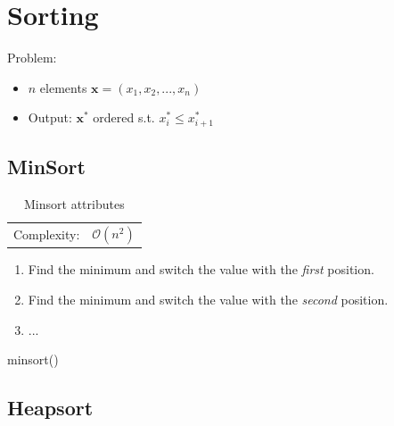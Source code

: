 \documentclass[12pt, a4paper]{scrartcl}
\author{Michael Floßmann}
\begin{document}
\tableofcontents{}
\section{Sorting}
\label{sec:sorting}
Problem:
\begin{itemize}
\item $n$ elements $\mathbf{x}=(x_1,x_2,...,x_n)$
\item Output: $\mathbf{x^*}$ ordered s.t. $x^*_i\le x^*_{i+1}$
\end{itemize}

\subsection{MinSort}
\label{sec:minsort}
\begin{table}[!h]
  \centering
  \begin{tabular}{lc}
    Complexity:&$\mathcal{O}(n^2)$
  \end{tabular}
  \caption{Minsort attributes}
  \label{tab:minsort}
\end{table}
\begin{enumerate}
\item Find the minimum and switch the value with the \emph{first} position.
\item Find the minimum and switch the value with the \emph{second} position.
\item ...
\end{enumerate}
\begin{listing}
  
  \caption{minsort()}
\end{listing}
\subsection{Heapsort}
\label{sec:heapsort}
\end{document}
